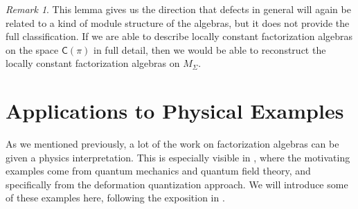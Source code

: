 \documentclass[12pt,a4paper]{article}
\newcounter{counter} \numberwithin{counter}{section}
\theoremstyle{definition}
\theoremstyle{plain}
\theoremstyle{remark}
\newtheorem{remark}[counter]{Remark}
\begin{document}
\begin{remark}
    This lemma gives us the direction that defects in general will again be related to a kind of module structure of the algebras, but it does not provide the full classification. If we are able to describe locally constant factorization algebras on the space $\mathsf{C}(\pi)$ in full detail, then we would be able to reconstruct the locally constant factorization algebras on $M_{\Sigma}$.
\end{remark}






\section{Applications to Physical Examples}\label{ch:physics}

As we mentioned previously, a lot of the work on factorization algebras can be given a physics interpretation. This is especially visible in \cite{cg2016}, where the motivating examples come from quantum mechanics and quantum field theory, and specifically from the deformation quantization approach. We will introduce some of these examples here, following the exposition in \cite{cg2016}.
\end{document}
